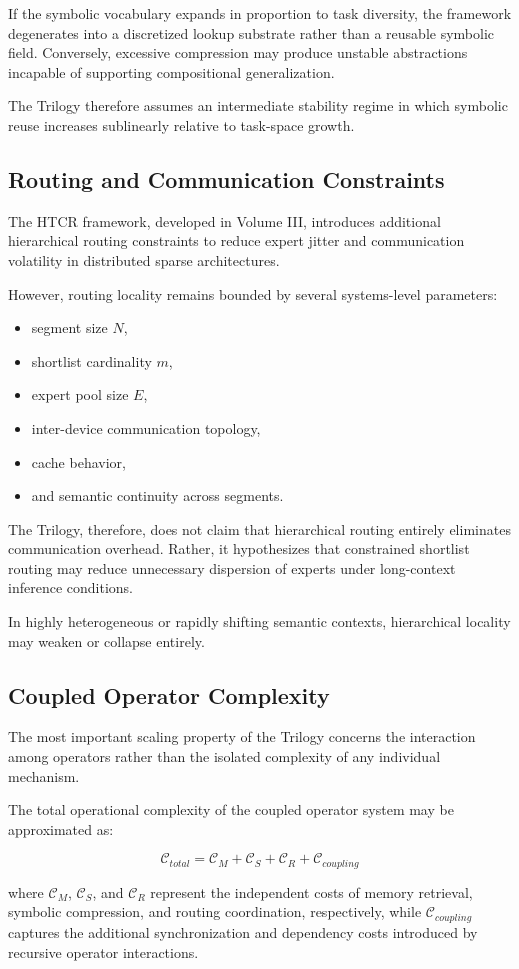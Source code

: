 If the symbolic vocabulary expands in proportion to task diversity, the framework degenerates into a discretized lookup substrate rather than a reusable symbolic field. Conversely, excessive compression may
produce unstable abstractions incapable of supporting compositional generalization.

The Trilogy therefore assumes an intermediate stability regime in which symbolic reuse increases sublinearly relative to task-space growth.

\subsection*{Routing and Communication Constraints}

The HTCR framework, developed in Volume III, introduces additional hierarchical routing constraints to reduce expert jitter and communication volatility in distributed sparse architectures.

However, routing locality remains bounded by several systems-level parameters:

\begin{itemize}
    \item segment size \(N\),
    \item shortlist cardinality \(m\),
    \item expert pool size \(E\),
    \item inter-device communication topology,
    \item cache behavior,
    \item and semantic continuity across segments.
\end{itemize}

The Trilogy, therefore, does not claim that hierarchical routing entirely eliminates communication overhead. Rather, it hypothesizes that constrained shortlist routing may reduce unnecessary dispersion of experts under long-context inference conditions.

In highly heterogeneous or rapidly shifting semantic contexts, hierarchical locality may weaken or collapse entirely.

\subsection*{Coupled Operator Complexity}

The most important scaling property of the Trilogy concerns the interaction among operators rather than the isolated complexity of any individual mechanism.

The total operational complexity of the coupled operator system may be approximated as:

\[
\mathcal{C}_{total}
=
\mathcal{C}_{M}
+
\mathcal{C}_{S}
+
\mathcal{C}_{R}
+
\mathcal{C}_{coupling}
\]

where \(\mathcal{C}_{M}\),  \(\mathcal{C}_{S}\), and \(\mathcal{C}_{R}\)  represent the independent costs of memory retrieval, symbolic compression, and routing coordination, respectively, while  \(\mathcal{C}_{coupling}\)  captures the additional synchronization and dependency costs introduced by recursive operator interactions.
